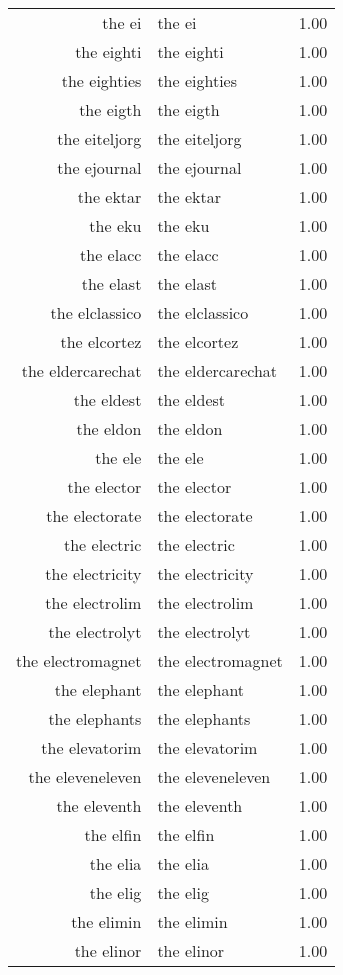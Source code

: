 \begin{table}[ht]
\begin{tabular}{rlr}
  the ei & the ei & 1.00 \\ 
  the eighti & the eighti & 1.00 \\ 
  the eighties & the eighties & 1.00 \\ 
  the eigth & the eigth & 1.00 \\ 
  the eiteljorg & the eiteljorg & 1.00 \\ 
  the ejournal & the ejournal & 1.00 \\ 
  the ektar & the ektar & 1.00 \\ 
  the eku & the eku & 1.00 \\ 
  the elacc & the elacc & 1.00 \\ 
  the elast & the elast & 1.00 \\ 
  the elclassico & the elclassico & 1.00 \\ 
  the elcortez & the elcortez & 1.00 \\ 
  the eldercarechat & the eldercarechat & 1.00 \\ 
  the eldest & the eldest & 1.00 \\ 
  the eldon & the eldon & 1.00 \\ 
  the ele & the ele & 1.00 \\ 
  the elector & the elector & 1.00 \\ 
  the electorate & the electorate & 1.00 \\ 
  the electric & the electric & 1.00 \\ 
  the electricity & the electricity & 1.00 \\ 
  the electrolim & the electrolim & 1.00 \\ 
  the electrolyt & the electrolyt & 1.00 \\ 
  the electromagnet & the electromagnet & 1.00 \\ 
  the elephant & the elephant & 1.00 \\ 
  the elephants & the elephants & 1.00 \\ 
  the elevatorim & the elevatorim & 1.00 \\ 
  the eleveneleven & the eleveneleven & 1.00 \\ 
  the eleventh & the eleventh & 1.00 \\ 
  the elfin & the elfin & 1.00 \\ 
  the elia & the elia & 1.00 \\ 
  the elig & the elig & 1.00 \\ 
  the elimin & the elimin & 1.00 \\ 
  the elinor & the elinor & 1.00 \\ 

\end{tabular}
\end{table}
